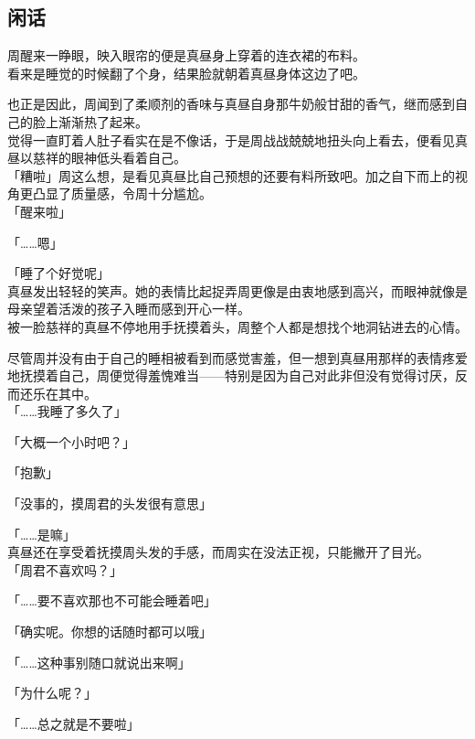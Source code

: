 \subsection{闲话}

周醒来一睁眼，映入眼帘的便是真昼身上穿着的连衣裙的布料。\\

看来是睡觉的时候翻了个身，结果脸就朝着真昼身体这边了吧。

也正是因此，周闻到了柔顺剂的香味与真昼自身那牛奶般甘甜的香气，继而感到自己的脸上渐渐热了起来。\\

觉得一直盯着人肚子看实在是不像话，于是周战战兢兢地扭头向上看去，便看见真昼以慈祥的眼神低头看着自己。\\

「糟啦」周这么想，是看见真昼比自己预想的还要有料所致吧。加之自下而上的视角更凸显了质量感，令周十分尴尬。\\

「醒来啦」

「……嗯」

「睡了个好觉呢」\\

真昼发出轻轻的笑声。她的表情比起捉弄周更像是由衷地感到高兴，而眼神就像是母亲望着活泼的孩子入睡而感到开心一样。\\

被一脸慈祥的真昼不停地用手抚摸着头，周整个人都是想找个地洞钻进去的心情。

尽管周并没有由于自己的睡相被看到而感觉害羞，但一想到真昼用那样的表情疼爱地抚摸着自己，周便觉得羞愧难当——特别是因为自己对此非但没有觉得讨厌，反而还乐在其中。\\

「……我睡了多久了」

「大概一个小时吧？」

「抱歉」

「没事的，摸周君的头发很有意思」

「……是嘛」\\

真昼还在享受着抚摸周头发的手感，而周实在没法正视，只能撇开了目光。\\

「周君不喜欢吗？」

「……要不喜欢那也不可能会睡着吧」

「确实呢。你想的话随时都可以哦」

「……这种事别随口就说出来啊」

「为什么呢？」

「……总之就是不要啦」\\

